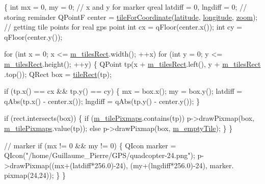 \begin{DoxyCode}
\{
    \textcolor{keywordtype}{int} mx = 0, my = 0; \textcolor{comment}{// x and y for marker}
    qreal latdiff = 0, lngdiff = 0; \textcolor{comment}{// storing reminder}
    QPointF center = \hyperlink{slippymap_8cpp_a7b006b28fd0e4ace99c58e6162b501c9}{tileForCoordinate}(\hyperlink{classSlippyMap_a223220fdcbf2197845f009d48225c0c8}{latitude}, 
      \hyperlink{classSlippyMap_af93efe003c192b7bc6a1ece6c7342de6}{longitude}, \hyperlink{classSlippyMap_a13dcc9915570a1a333c1e9275ffe64b3}{zoom}); \textcolor{comment}{// getting tile points for real gps point}
    \textcolor{keywordtype}{int} cx = qFloor(center.x());
    \textcolor{keywordtype}{int} cy = qFloor(center.y());

    \textcolor{keywordflow}{for} (\textcolor{keywordtype}{int} x = 0; x <= \hyperlink{classSlippyMap_aa8154d798c574c1d6ed89f3347835a76}{m\_tilesRect}.width(); ++x)
        \textcolor{keywordflow}{for} (\textcolor{keywordtype}{int} y = 0; y <= \hyperlink{classSlippyMap_aa8154d798c574c1d6ed89f3347835a76}{m\_tilesRect}.height(); ++y) \{
            QPoint tp(x + \hyperlink{classSlippyMap_aa8154d798c574c1d6ed89f3347835a76}{m\_tilesRect}.left(), y + \hyperlink{classSlippyMap_aa8154d798c574c1d6ed89f3347835a76}{m\_tilesRect}
      .top());
            QRect box = \hyperlink{classSlippyMap_ada0e611fc8d684f9255236237105508d}{tileRect}(tp);

            \textcolor{keywordflow}{if} (tp.x() == cx && tp.y() == cy) \{
            mx = box.x();
            my = box.y();
            latdiff = qAbs(tp.x() - center.x());
            lngdiff = qAbs(tp.y() - center.y());
            \}

            \textcolor{keywordflow}{if} (rect.intersects(box)) \{
                \textcolor{keywordflow}{if} (\hyperlink{classSlippyMap_a2c88805d8030caedb95af10ce5d95aae}{m\_tilePixmaps}.contains(tp))
                    p->drawPixmap(box, \hyperlink{classSlippyMap_a2c88805d8030caedb95af10ce5d95aae}{m\_tilePixmaps}.value(tp));
                \textcolor{keywordflow}{else}
                    p->drawPixmap(box, \hyperlink{classSlippyMap_a0021bf8f7ecbaa61bd47f8f0a36ea9d0}{m\_emptyTile});
            \}
        \}

    \textcolor{comment}{// marker}
    \textcolor{keywordflow}{if} (mx != 0 && my != 0) \{
    QIcon marker = QIcon(\textcolor{stringliteral}{"/home/Guillaume\_Pierre/GPS/quadcopter-24.png"});
    p->drawPixmap((mx+(latdiff*256.0)-24), (my+(lngdiff*256.0)-24), marker.
      pixmap(24,24));
    \}
\}
\end{DoxyCode}
